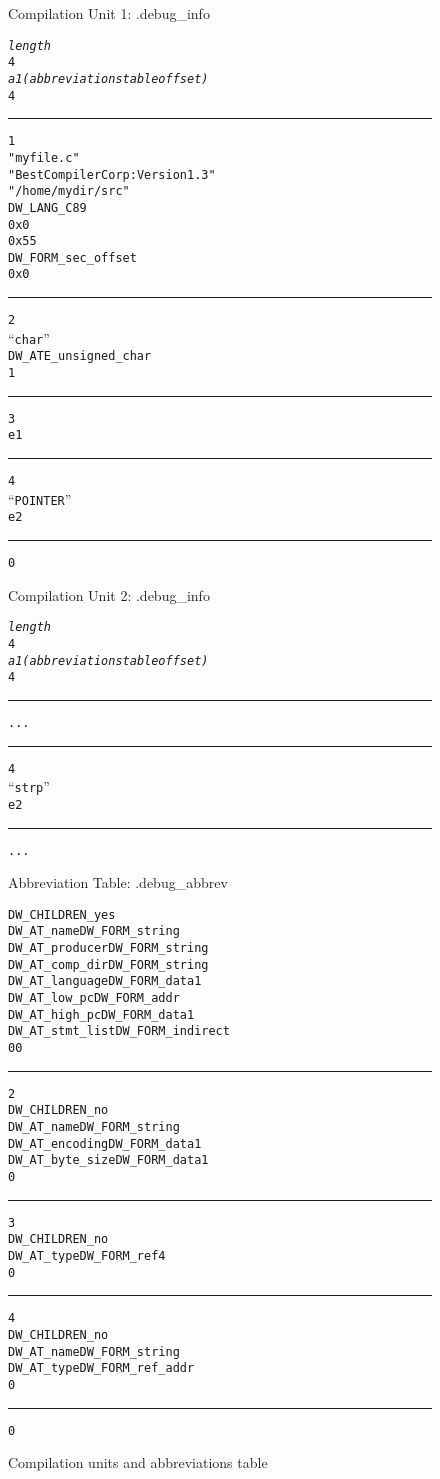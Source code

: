 \clearpage
\begin{figure}[here]
\begin{minipage}{0.4\textwidth}
\centering
Compilation Unit 1: .debug\_info
\begin{framed}
\scriptsize
\begin{alltt}
\textit{length}
4
\textit{a1 (abbreviations table offset)}
4
\vspace{0.01cm}
\hrule
1
"myfile.c"
"Best Compiler Corp: Version 1.3"
"/home/mydir/src"
DW\_LANG\_C89
0x0
0x55
DW\_FORM\_sec\_offset
0x0
\vspace{0.01cm}
\hrule
2
“char”
DW\_ATE\_unsigned\_char
1
\vspace{0.01cm}
\hrule
3
e1
\vspace{0.01cm}
\hrule
4
“POINTER”
e2
\vspace{0.01cm}
\hrule
0
\end{alltt}
%
%
\end{framed}
Compilation Unit 2: .debug\_info
\begin{framed}
\scriptsize
\begin{alltt}
\textit{length}
4
\textit{a1 (abbreviations table offset)}
4
\vspace{0.01cm}
\hrule
...
\vspace{0.01cm}
\hrule
4
“strp”
e2
\vspace{0.01cm}
\hrule
...
\end{alltt}
%
%
\end{framed}
\end{minipage}
\hfill
\begin{minipage}{0.4\textwidth}
\centering
Abbreviation Table: .debug\_abbrev
\begin{framed}
\scriptsize
\begin{alltt}
DW\_CHILDREN\_yes
DW\_AT\_name       DW\_FORM\_string
DW\_AT\_producer   DW\_FORM\_string
DW\_AT\_comp\_dir   DW\_FORM\_string
DW\_AT\_language   DW\_FORM\_data1
DW\_AT\_low\_pc     DW\_FORM\_addr
DW\_AT\_high\_pc    DW\_FORM\_data1
DW\_AT\_stmt\_list  DW\_FORM\_indirect
0                  0
\vspace{0.01cm}
\hrule
2
DW\_CHILDREN\_no
DW\_AT\_name       DW\_FORM\_string
DW\_AT\_encoding   DW\_FORM\_data1
DW\_AT\_byte\_size  DW\_FORM\_data1
0
\vspace{0.01cm}
\hrule
3
DW\_CHILDREN\_no
DW\_AT\_type       DW\_FORM\_ref4
0
\vspace{0.01cm}
\hrule
4
DW\_CHILDREN\_no
DW\_AT\_name      DW\_FORM\_string
DW\_AT\_type      DW\_FORM\_ref\_addr
0
\vspace{0.01cm}
\hrule
0
\end{alltt}
\end{framed}
\end{minipage}
\caption{Compilation units and abbreviations table} \label{fig:compilationunitsandabbreviationstable}
\end{figure}

